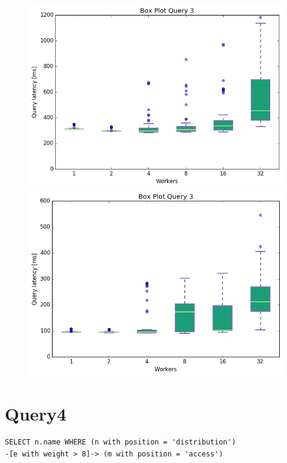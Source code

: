 \documentclass[11pt,singlecolumn]{scrartcl}
\begin{document}
\begin{figure}[!tbp]
  \centering
  \RawFloats
  \begin{minipage}[b]{0.5\textwidth}
    \includegraphics[width=\textwidth]{boxesjl/q3}
  \end{minipage}
  \hfill
  \begin{minipage}[b]{0.5\textwidth}
    \includegraphics[width=\textwidth]{boxesjs/q3}
  \end{minipage}
\end{figure}
\clearpage
\section{Query4}
\begin{verbatim}
SELECT n.name WHERE (n with position = 'distribution')
-[e with weight > 8]-> (m with position = 'access')\end{verbatim}
\end{document}
